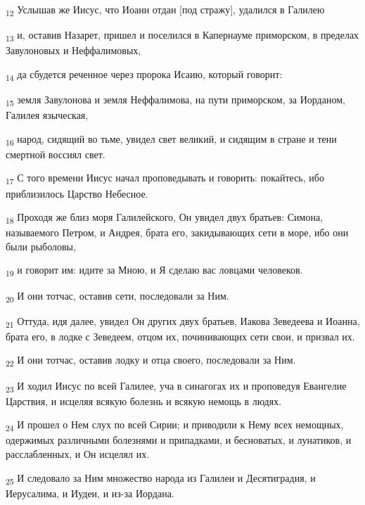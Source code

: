 \begin{tcolorbox}
\textsubscript{12} Услышав же Иисус, что Иоанн отдан [под стражу], удалился в Галилею
\end{tcolorbox}
\begin{tcolorbox}
\textsubscript{13} и, оставив Назарет, пришел и поселился в Капернауме приморском, в пределах Завулоновых и Неффалимовых,
\end{tcolorbox}
\begin{tcolorbox}
\textsubscript{14} да сбудется реченное через пророка Исаию, который говорит:
\end{tcolorbox}
\begin{tcolorbox}
\textsubscript{15} земля Завулонова и земля Неффалимова, на пути приморском, за Иорданом, Галилея языческая,
\end{tcolorbox}
\begin{tcolorbox}
\textsubscript{16} народ, сидящий во тьме, увидел свет великий, и сидящим в стране и тени смертной воссиял свет.
\end{tcolorbox}
\begin{tcolorbox}
\textsubscript{17} С того времени Иисус начал проповедывать и говорить: покайтесь, ибо приблизилось Царство Небесное.
\end{tcolorbox}
\begin{tcolorbox}
\textsubscript{18} Проходя же близ моря Галилейского, Он увидел двух братьев: Симона, называемого Петром, и Андрея, брата его, закидывающих сети в море, ибо они были рыболовы,
\end{tcolorbox}
\begin{tcolorbox}
\textsubscript{19} и говорит им: идите за Мною, и Я сделаю вас ловцами человеков.
\end{tcolorbox}
\begin{tcolorbox}
\textsubscript{20} И они тотчас, оставив сети, последовали за Ним.
\end{tcolorbox}
\begin{tcolorbox}
\textsubscript{21} Оттуда, идя далее, увидел Он других двух братьев, Иакова Зеведеева и Иоанна, брата его, в лодке с Зеведеем, отцом их, починивающих сети свои, и призвал их.
\end{tcolorbox}
\begin{tcolorbox}
\textsubscript{22} И они тотчас, оставив лодку и отца своего, последовали за Ним.
\end{tcolorbox}
\begin{tcolorbox}
\textsubscript{23} И ходил Иисус по всей Галилее, уча в синагогах их и проповедуя Евангелие Царствия, и исцеляя всякую болезнь и всякую немощь в людях.
\end{tcolorbox}
\begin{tcolorbox}
\textsubscript{24} И прошел о Нем слух по всей Сирии; и приводили к Нему всех немощных, одержимых различными болезнями и припадками, и бесноватых, и лунатиков, и расслабленных, и Он исцелял их.
\end{tcolorbox}
\begin{tcolorbox}
\textsubscript{25} И следовало за Ним множество народа из Галилеи и Десятиградия, и Иерусалима, и Иудеи, и из-за Иордана.
\end{tcolorbox}
